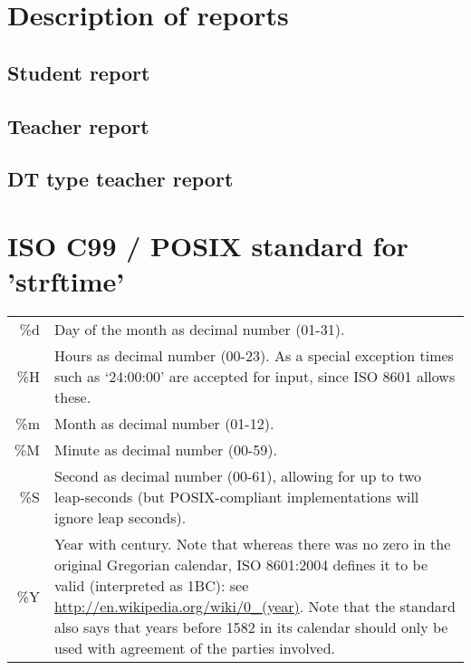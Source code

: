 \documentclass{scrartcl}
\begin{document}
\section{Description of reports}
\subsection{Student report}
\subsection{Teacher report}
\subsection{DT type teacher report}
\appendix
\section{ISO C99 / POSIX standard for 'strftime'}\label{app:posix}
\begin{tabular}{rp{14cm}} 
\%d & Day of the month as decimal number (01-31).\\
\%H & Hours as decimal number (00-23).  As a special exception times such as ‘24:00:00’ are accepted for input, since ISO 8601 allows these.\\
\%m & Month as decimal number (01-12).\\
\%M & Minute as decimal number (00-59).\\
\%S & Second as decimal number (00-61), allowing for up to two leap-seconds (but POSIX-compliant implementations will ignore leap seconds).\\
\%Y & Year with century.  Note that whereas there was no zero in the original Gregorian calendar, ISO 8601:2004 defines it to be valid (interpreted as 1BC): see \url{http://en.wikipedia.org/wiki/0_(year)}.  Note that the standard also says that years before 1582 in its calendar should only be used with agreement of the parties involved.
\end{tabular}
\end{document}
